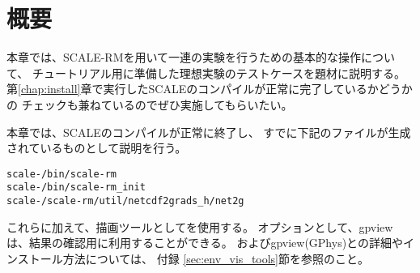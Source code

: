 \section{概要} \label{sec:ideal_exp_intro}

本章では、SCALE-RMを用いて一連の実験を行うための基本的な操作について、
チュートリアル用に準備した理想実験のテストケースを題材に説明する。\\
第\ref{chap:install}章で実行したSCALEのコンパイルが正常に完了しているかどうかの
チェックも兼ねているのでぜひ実施してもらいたい。

本章では、SCALEのコンパイルが正常に終了し、
すでに下記のファイルが生成されているものとして説明を行う。
\begin{alltt}
  scale-{\version}/bin/scale-rm
  scale-{\version}/bin/scale-rm_init
  scale-{\version}/scale-rm/util/netcdf2grads_h/net2g
\end{alltt}
これらに加えて、描画ツールとして\grads を使用する。
オプションとして、gpviewは、結果の確認用に利用することができる。
\grads およびgpview(GPhys)との詳細やインストール方法については、
付録 \ref{sec:env_vis_tools}節を参照のこと。




